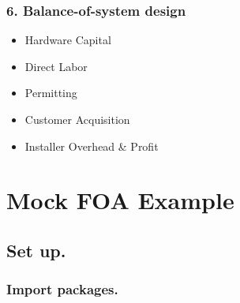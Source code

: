 \documentclass[letterpaper,10pt,english]{sphinxmanual}
\begin{document}
\subsection{6. Balance-of-system design}
\label{\detokenize{mock-foa:balance-of-system-design}}\begin{itemize}
\item {} 
Hardware Capital

\item {} 
Direct Labor

\item {} 
Permitting

\item {} 
Customer Acquisition

\item {} 
Installer Overhead \& Profit

\end{itemize}


\chapter{Mock FOA Example}
\label{\detokenize{ioc-1:mock-foa-example}}\label{\detokenize{ioc-1::doc}}

\section{Set up.}
\label{\detokenize{ioc-1:set-up}}

\subsection{Import packages.}
\label{\detokenize{ioc-1:import-packages}}
\begin{sphinxVerbatim}[commandchars=\\\{\}]
 
 
 
\end{sphinxVerbatim}

\begin{sphinxVerbatim}[commandchars=\\\{\}]
               
   
              
             
               

              
   
\end{sphinxVerbatim}
\end{document}

